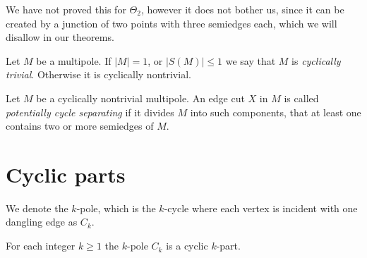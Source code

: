 \documentclass[12pt, twoside]{book}
\begin{document}
We have not proved this for $\Theta_2$, however it does not bother us, since it can be created by a junction of two points with three semiedges each, which we will disallow in our theorems.

\begin{definition}
	Let $M$ be a multipole. If $|M|=1$, or $|S(M)|\leq 1$ we say that $M$ is \textit{cyclically trivial}. Otherwise it is cyclically nontrivial. 
\end{definition}

\begin{definition}
	Let $M$ be a cyclically nontrivial multipole. An edge cut $X$ in $M$ is called \textit{potentially cycle separating} if it divides $M$ into such components, that at least one contains two or more semiedges of $M$.
\end{definition}


\section{Cyclic parts}\label{sec:cyclic-part-results}

We denote the $k$-pole, which is the $k$-cycle where each vertex is incident with one dangling edge as $C_k$.

\begin{lemma}\label{lem:each-cycle-cyclic-part}
	For each integer $k\geq 1$ the $k$-pole $C_k$ is a cyclic $k$-part. 
\end{lemma}
\end{document}
